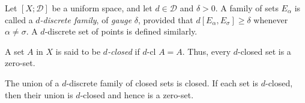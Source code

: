 Let $[X; \mathcal{D}]$ be a uniform space, and let $d \in \mathcal{D}$ and $\delta > 0$. A family of sets $E_\alpha$ is called a \textit{$d$-discrete family}, of \textit{gauge} $\delta$, provided that $d[E_\alpha, E_\sigma] \geq \delta$ whenever $\alpha \neq \sigma$. A $d$-discrete set of points is defined similarly.

A set $A$ in $X$ is said to be \textit{$d$-closed} if $d\text{-cl } A = A$. Thus, every $d$-closed set is a zero-set.

The union of a $d$-discrete family of closed sets is closed. If each set is $d$-closed, then their union is $d$-closed and hence is a zero-set.
